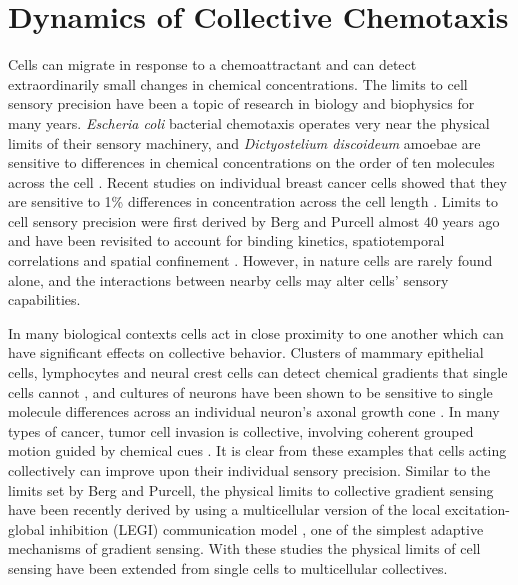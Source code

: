 %
%

\chapter{Dynamics of Collective Chemotaxis}

Cells can migrate in response to a chemoattractant and can detect extraordinarily small changes in chemical concentrations. The limits to cell sensory precision have been a topic of research in biology and biophysics for many years. \textit{Escheria coli} bacterial chemotaxis operates very near the physical limits of their sensory machinery, and \textit{Dictyostelium discoideum} amoebae are sensitive to differences in chemical concentrations on the order of ten molecules across the cell \cite{berg1977physics,song2006dictyostelium}. Recent studies on individual breast cancer cells showed that they are sensitive to 1\% differences in concentration across the cell length \cite{shields2007autologous}. Limits to cell sensory precision were first derived by Berg and Purcell almost 40 years ago \cite{berg1977physics} and have been revisited to account for binding kinetics, spatiotemporal correlations and spatial confinement \cite{bialek2005physical, kaizu2014berg, bicknell2015limits}. However, in nature cells are rarely found alone, and the interactions between nearby cells may alter cells' sensory capabilities.

In many biological contexts cells act in close proximity to one another which can have significant effects on collective behavior. Clusters of mammary epithelial cells, lymphocytes and neural crest cells can detect chemical gradients that single cells cannot \cite{ellison2016cell,malet2015collective,theveneau2010collective}, and cultures of neurons have been shown to be sensitive to single molecule differences across an individual neuron's axonal growth cone \cite{rosoff2004new}. In many types of cancer, tumor cell invasion is collective, involving coherent grouped motion guided by chemical cues \cite{cheung2013collective, friedl2012classifying, aceto2014circulating, puliafito2015three}. It is clear from these examples that cells acting collectively can improve upon their individual sensory precision. Similar to the limits set by Berg and Purcell, the physical limits to collective gradient sensing have been recently derived \cite{mugler2016limits,ellison2016cell} by using a multicellular version of the local excitation-global inhibition (LEGI) communication model \cite{levchenko2002models}, one of the simplest adaptive mechanisms of gradient sensing. With these studies the physical limits of cell sensing have been extended from single cells to multicellular collectives.

